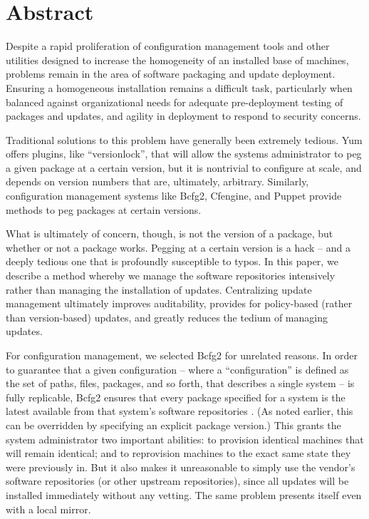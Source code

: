 \section{Abstract}
\label{sec:abstract}

Despite a rapid proliferation of configuration management tools and
other utilities designed to increase the homogeneity of an installed
base of machines, problems remain in the area of software packaging
and update deployment.  Ensuring a homogeneous installation remains a
difficult task, particularly when balanced against organizational
needs for adequate pre-deployment testing of packages and updates, and
agility in deployment to respond to security concerns.

Traditional solutions to this problem have generally been extremely
tedious.  Yum offers plugins, like ``versionlock'', that will allow
the systems administrator to peg a given package at a certain version,
but it is nontrivial to configure at scale, and depends on version
numbers that are, ultimately, arbitrary.  Similarly, configuration
management systems like Bcfg2, Cfengine, and Puppet provide methods to
peg packages at certain versions.

What is ultimately of concern, though, is not the version of a
package, but whether or not a package works.  Pegging at a certain
version is a hack -- and a deeply tedious one that is profoundly
susceptible to typos.  In this paper, we describe a method whereby we
manage the software repositories intensively rather than managing the
installation of updates.  Centralizing update management ultimately
improves auditability, provides for policy-based (rather than
version-based) updates, and greatly reduces the tedium of managing
updates.

For configuration management, we selected Bcfg2 \cite{Des11} for
unrelated reasons.  In order to guarantee that a given configuration
-- where a ``configuration'' is defined as the set of paths, files,
packages, and so forth, that describes a single system -- is fully
replicable, Bcfg2 ensures that every package specified for a system is
the latest available from that system's software
repositories \cite{JL11}.  (As noted earlier, this can be overridden by
specifying an explicit package version.)  This grants the system
administrator two important abilities: to provision identical machines
that will remain identical; and to reprovision machines to the exact
same state they were previously in.  But it also makes it unreasonable
to simply use the vendor's software repositories (or other upstream
repositories), since all updates will be installed immediately without
any vetting.  The same problem presents itself even with a local
mirror.

